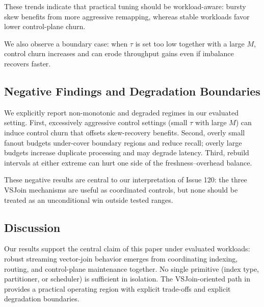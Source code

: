 These trends indicate that practical tuning should be workload-aware: bursty skew benefits from more aggressive remapping, whereas stable workloads favor lower control-plane churn.

We also observe a boundary case: when $\tau$ is set too low together with a large $M$, control churn increases and can erode throughput gains even if imbalance recovers faster.

\subsection{Negative Findings and Degradation Boundaries}

We explicitly report non-monotonic and degraded regimes in our evaluated setting. First, excessively aggressive control settings (small $\tau$ with large $M$) can induce control churn that offsets skew-recovery benefits. Second, overly small fanout budgets under-cover boundary regions and reduce recall; overly large budgets increase duplicate processing and may degrade latency. Third, rebuild intervals at either extreme can hurt one side of the freshness--overhead balance.

These negative results are central to our interpretation of Issue 120: the three VSJoin mechanisms are useful as coordinated controls, but none should be treated as an unconditional win outside tested ranges.

\subsection{Discussion}

Our results support the central claim of this paper under evaluated workloads: robust streaming vector-join behavior emerges from coordinating indexing, routing, and control-plane maintenance together. No single primitive (index type, partitioner, or scheduler) is sufficient in isolation. The VSJoin-oriented path in \system provides a practical operating region with explicit trade-offs and explicit degradation boundaries.
